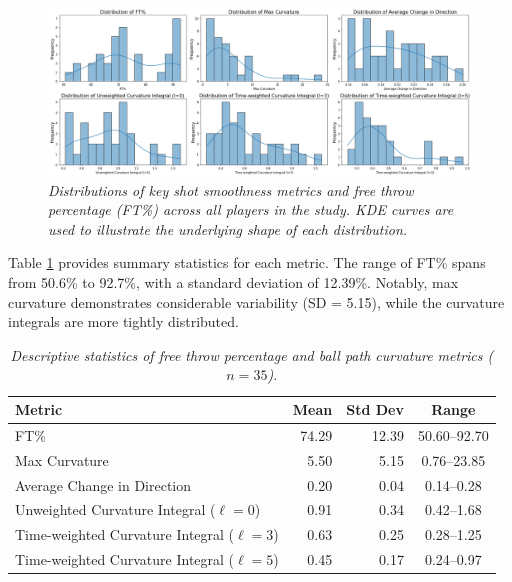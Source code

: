 \documentclass{article}
\begin{document}
    \begin{figure}[H]
        \centering
        \includegraphics[width=0.8\linewidth]{reports/arxiv/distributions.png}
        \caption{\it Distributions of key shot smoothness metrics and free throw percentage (FT\%) across all players in the study. KDE curves are used to illustrate the underlying shape of each distribution.}
        \label{fig:scattered}
    \end{figure}
    
    Table \ref{tab:summary-stats} provides summary statistics for each metric. The range of FT\% spans from 50.6\% to 92.7\%, with a standard deviation of 12.39\%. Notably, max curvature demonstrates considerable variability (SD = 5.15), while the curvature integrals are more tightly distributed.

    \begin{table}[H]
        \centering
        \begin{tabular}{lrrc}
        \toprule
        \textbf{Metric} & \textbf{Mean} & \textbf{Std Dev} & \textbf{Range} \\
        \midrule
        FT\% & 74.29 & 12.39 & 50.60--92.70 \\
        Max Curvature & 5.50 & 5.15 & 0.76--23.85 \\
        Average Change in Direction & 0.20 & 0.04 & 0.14--0.28 \\
        Unweighted Curvature Integral ($\ell=0$) & 0.91 & 0.34 & 0.42--1.68 \\
        Time-weighted Curvature Integral ($\ell=3$) & 0.63 & 0.25 & 0.28--1.25 \\
        Time-weighted Curvature Integral ($\ell=5$) & 0.45 & 0.17 & 0.24--0.97 \\
        \bottomrule
        \end{tabular}
        \caption{\it Descriptive statistics of free throw percentage and ball path curvature metrics ($n = 35$).}
        \label{tab:summary-stats}
    \end{table}
\end{document}
